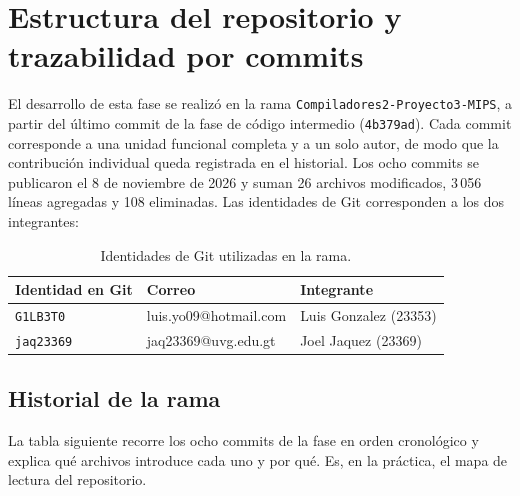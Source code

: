 \documentclass[11pt,a4paper]{article}
\begin{document}
\section{Estructura del repositorio y trazabilidad por commits}

El desarrollo de esta fase se realizó en la rama
\texttt{Compiladores2-Proyecto3-MIPS}, a partir del último commit de la fase de
código intermedio (\texttt{4b379ad}). Cada commit corresponde a una unidad
funcional completa y a un solo autor, de modo que la contribución individual
queda registrada en el historial. Los ocho commits se publicaron el 8 de
noviembre de 2026 y suman 26 archivos modificados, 3\,056 líneas agregadas y 108
eliminadas. Las identidades de Git corresponden a los dos integrantes:

\begin{table}[H]
\centering
\small
\begin{tabular}{lll}
\toprule
\textbf{Identidad en Git} & \textbf{Correo} & \textbf{Integrante} \\
\midrule
\texttt{G1LB3T0}  & luis.yo09@hotmail.com & Luis Gonzalez (23353) \\
\texttt{jaq23369} & jaq23369@uvg.edu.gt   & Joel Jaquez (23369) \\
\bottomrule
\end{tabular}
\caption{Identidades de Git utilizadas en la rama.}
\end{table}

\subsection{Historial de la rama}

La tabla siguiente recorre los ocho commits de la fase en orden cronológico y
explica qué archivos introduce cada uno y por qué. Es, en la práctica, el mapa
de lectura del repositorio.
\end{document}
